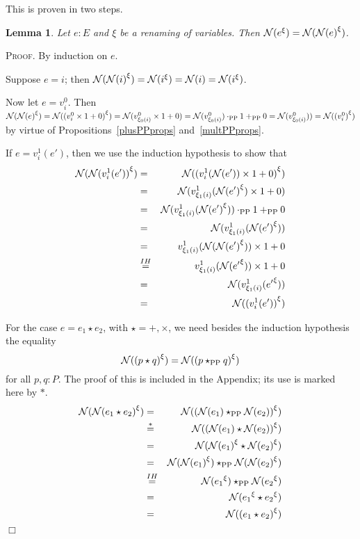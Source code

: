 \documentclass{article}
\newtheorem{lemma}[definition]{Lemma}
\newenvironment{proof}{\smallskip\textsc{Proof.}}{\hspace*{\fill}$\Box$}
\newcommand{\N}{{\cal N}}
\newcommand{\renamevar}[2]{\ensuremath{{#1}^{#2}}}
\newcommand{\plusPP}{\ensuremath{+_{\mathrm{PP}}}}
\newcommand{\multPP}{\ensuremath{\cdot_{\mathrm{PP}}}}
\newcommand{\starPP}{\ensuremath{\star_{\mathrm{PP}}}}
\begin{document}
This is proven in two steps.
\begin{lemma}\label{substlemmaaux} Let $e:E$ and $\xi$ be a renaming of
variables.  Then $\N(\renamevar e\xi)=\N(\renamevar{\N(e)}\xi)$.
\end{lemma}
\begin{proof}
By induction on $e$.

Suppose $e=i$; then
$\N(\renamevar{\N(i)}\xi)%
=\N(\renamevar i\xi)%
=\N(i)%
=\N(\renamevar i\xi)$.

Now let $e=v^0_i$.  Then
$\N(\renamevar{\N(e)}\xi)%
=\N(\renamevar{(v^0_i\times1+0)}\xi)%
=\N(v^0_{\xi_0(i)}\times1+0)%
=\N(v^0_{\xi_0(i)})\multPP1\plusPP0%
=\N(v^0_{\xi_0(i)}))%
=\N(\renamevar{(v^0_i)}\xi)$
by virtue of Propositions~\ref{plusPPprops} and~\ref{multPPprops}.

If $e=v^1_i(e')$, then we use the induction hypothesis to show that
\begin{eqnarray*}
\N(\renamevar{\N(v^1_i(e'))}\xi)
 & = & \N(\renamevar{(v^1_i(\N(e'))\times1+0)}\xi)\\
 & = & \N(v^1_{\xi_1(i)}(\renamevar{\N(e')}\xi)\times1+0) \\
 & = & \N(v^1_{\xi_1(i)}(\renamevar{\N(e')}\xi))\multPP1\plusPP0 \\
 & = & \N(v^1_{\xi_1(i)}(\renamevar{\N(e')}\xi)) \\
 & = & v^1_{\xi_1(i)}(\N(\renamevar{\N(e')}\xi))\times1+0 \\
 & \stackrel{IH}= & v^1_{\xi_1(i)}(\N(\renamevar{e'}\xi))\times1+0 \\
 & = & \N(v^1_{\xi_1(i)}(\renamevar{e'}\xi)) \\
 & = & \N(\renamevar{(v^1_i(e'))}\xi)
\end{eqnarray*}

For the case $e=e_1\star e_2$, with $\star=+,\times$, we need besides the
induction hypothesis the equality
\begin{equation}\label{eqn:nvsstar}
\N(\renamevar{(p\star q)}\xi)=\N(\renamevar{(p\starPP q)}\xi)
\end{equation}
for all $p,q:P$.  The proof of this is included in the Appendix; its use is
marked here by $\ast$.
\begin{eqnarray*}
\N(\renamevar{\N(e_1\star e_2)}\xi)
 & = & \N(\renamevar{(\N(e_1)\starPP\N(e_2))}\xi) \\
 & \stackrel\ast= & \N(\renamevar{(\N(e_1)\star\N(e_2))}\xi) \\
 & = & \N(\renamevar{\N(e_1)}\xi\star\renamevar{\N(e_2)}\xi) \\
 & = & \N(\renamevar{\N(e_1)}\xi)\starPP\N(\renamevar{\N(e_2)}\xi) \\
 & \stackrel{IH}= & \N(\renamevar{e_1}\xi)\starPP\N(\renamevar{e_2}\xi) \\
 & = & \N(\renamevar{e_1}\xi\star\renamevar{e_2}\xi) \\
 & = & \N(\renamevar{(e_1\star e_2)}\xi) \\
\end{eqnarray*}
\end{proof}
\end{document}
